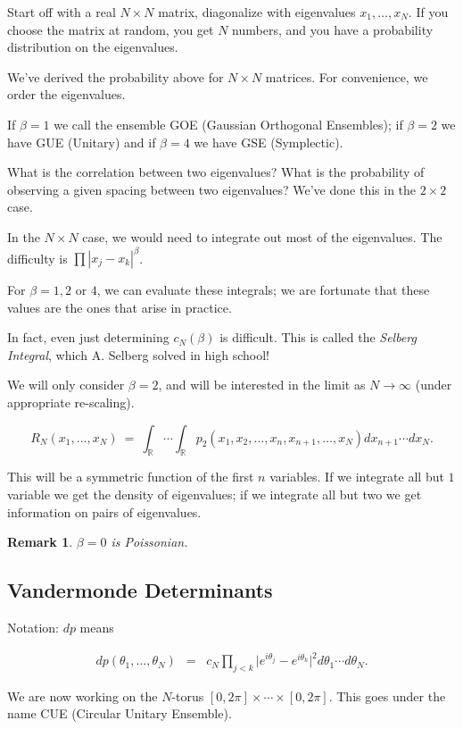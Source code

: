 \documentclass[12pt,letterpaper]{report}
\newcommand\be{\begin{equation}}
\newcommand\ee{\end{equation}}
\newcommand\bea{\begin{eqnarray}}
\newcommand\eea{\end{eqnarray}}
\newcommand{\R}{\ensuremath{\mathbb{R}}}
\newtheorem{rek}[thm]{Remark}
\begin{document}
Start off with a real $N\times N$ matrix, diagonalize with
eigenvalues $x_1, \dots, x_N$. If you choose the matrix at random,
you get $N$ numbers, and you have a probability distribution on
the eigenvalues.

We've derived the probability above for $N \times N$ matrices. For
convenience, we order the eigenvalues.

If $\beta = 1$ we call the ensemble GOE (Gaussian Orthogonal
Ensembles); if $\beta = 2$ we have GUE (Unitary) and if $\beta =
4$ we have GSE (Symplectic).

What is the correlation between two eigenvalues? What is the
probability of observing a given spacing between two eigenvalues?
We've done this in the $2 \times 2$ case.

In the $N \times N$ case, we would need to integrate out most of
the eigenvalues. The difficulty is $\prod |x_j - x_k|^\beta$.

For $\beta = 1, 2$ or $4$, we can evaluate these integrals; we are
fortunate that these values are the ones that arise in practice.

In fact, even just determining $c_N(\beta)$ is difficult. This is
called the \emph{Selberg Integral}, which A. Selberg solved in
high school!

We will only consider $\beta = 2$, and will be interested in the
limit as $N \to \infty$ (under appropriate re-scaling).

\be R_N(x_1,\dots,x_N) \ = \ \int_\R \cdots \int_\R
p_2(x_1,x_2,\dots,x_n,x_{n+1},\dots,x_N)dx_{n+1} \cdots dx_N. \ee

This will be a symmetric function of the first $n$ variables. If
we integrate all but $1$ variable we get the density of
eigenvalues; if we integrate all but two we get information on
pairs of eigenvalues.

\begin{rek} $\beta = 0$ is Poissonian. \end{rek}


\subsection{Vandermonde Determinants}

Notation: $dp$ means

\bea dp(\theta_1,\dots,\theta_N) &=& c_N \prod_{j<k} \Big|e^{i
\theta_j} - e^{i \theta_k}\Big|^2 d\theta_1 \cdots d\theta_N. \eea

We are now working on the $N$-torus $[0,2\pi] \times \cdots \times
[0,2\pi]$. This goes under the name CUE (Circular Unitary
Ensemble).
\end{document}
